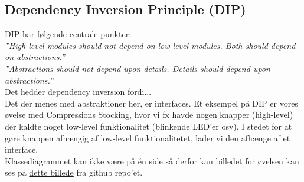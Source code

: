 \subsection{Dependency Inversion Principle (DIP)}
DIP har følgende centrale punkter:\\

\textit{''High level modules should not depend on low level modules. Both should depend on abstractions.''}\\

\textit{''Abstractions should not depend upon details. Details should depend upon abstractions.''}\\

Det hedder dependency inversion fordi...
\\

Det der menes med abstraktioner her, er interfaces. Et eksempel på DIP er vores øvelse med Compressions Stocking, hvor vi fx havde nogen knapper (high-level) der kaldte noget low-level funktionalitet (blinkende LED’er osv). I stedet for at gøre knappen afhængig af low-level funktionalitetet, lader vi den afhænge af et interface.\\

Klassediagrammet kan ikke være på én side så derfor kan billedet for øvelsen kan ses på  \href{https://raw.githubusercontent.com/BjornNorgaard/I4SWD/bdd4a11a87f182d81b3ed81409a2052e45be82c3/Eksamen/Disposition/figs/compressionstockings_classdiagram.PNG}{dette billede} fra github repo'et.
